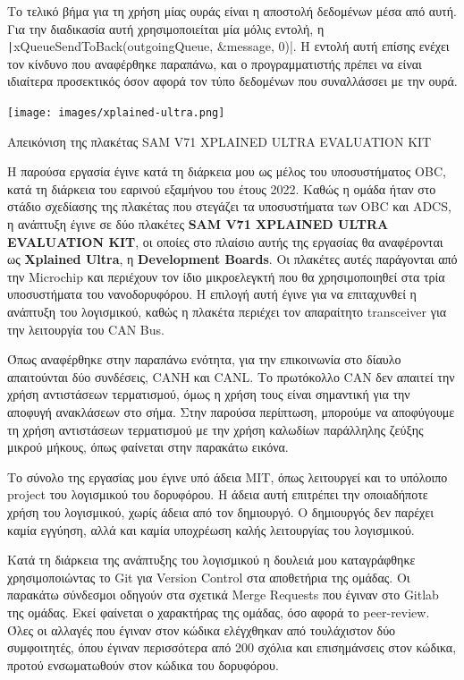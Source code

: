 \documentclass[a4paper,nobib,justified]{tufte-book}
\begin{document}
Το τελικό βήμα για τη χρήση μίας ουράς είναι η αποστολή δεδομένων μέσα από αυτή. Για την διαδικασία αυτή χρησιμοποιείται μία μόλις εντολή, η \texttt|xQueueSendToBack(outgoingQueue, &message, 0)|. Η εντολή αυτή επίσης ενέχει τον κίνδυνο που αναφέρθηκε παραπάνω, και ο προγραμματιστής πρέπει να είναι ιδιαίτερα προσεκτικός όσον αφορά τον τύπο δεδομένων που συναλλάσσει με την ουρά. 

\begin{marginfigure}
	\centering
	\texttt{[image: images/xplained-ultra.png]}
	\label{fig:xplained-ultra}
	\caption[Απεικόνιση της πλακέτας SAM V71 XPLAINED ULTRA EVALUATION KIT]{Απεικόνιση της πλακέτας SAM V71 XPLAINED ULTRA EVALUATION KIT}
\end{marginfigure}
Η παρούσα εργασία έγινε κατά τη διάρκεια μου ως μέλος του υποσυστήματος OBC, κατά τη διάρκεια του εαρινού εξαμήνου του έτους 2022. Καθώς η ομάδα ήταν στο στάδιο σχεδίασης της πλακέτας που στεγάζει τα υποσυστήματα των OBC και ADCS, η ανάπτυξη έγινε σε δύο πλακέτες \textbf{SAM V71 XPLAINED ULTRA EVALUATION KIT}, οι οποίες στο πλαίσιο αυτής της εργασίας θα αναφέρονται ως \textbf{Xplained Ultra}, η \textbf{Development Boards}. Οι πλακέτες αυτές παράγονται από την Microchip και περιέχουν τον ίδιο μικροελεγκτή που θα χρησιμοποιηθεί στα τρία υποσυστήματα του νανοδορυφόρου. Η επιλογή αυτή έγινε για να επιταχυνθεί η ανάπτυξη του λογισμικού, καθώς η πλακέτα περιέχει τον απαραίτητο transceiver για την λειτουργία του CAN Bus. 

Όπως αναφέρθηκε στην παραπάνω ενότητα, για την επικοινωνία στο δίαυλο απαιτούνται δύο συνδέσεις, CANH και CANL. Το πρωτόκολλο CAN δεν απαιτεί την χρήση αντιστάσεων τερματισμού, όμως η χρήση τους είναι σημαντική για την αποφυγή ανακλάσεων στο σήμα. Στην παρούσα περίπτωση, μπορούμε να αποφύγουμε τη χρήση αντιστάσεων τερματισμού με την χρήση καλωδίων παράλληλης ζεύξης μικρού μήκους, όπως φαίνεται στην παρακάτω εικόνα.


Το σύνολο της εργασίας μου έγινε υπό άδεια MIT, όπως λειτουργεί και το υπόλοιπο project του λογισμικού του δορυφόρου. Η άδεια αυτή επιτρέπει την οποιαδήποτε χρήση του λογισμικού, χωρίς άδεια από τον δημιουργό. Ο δημιουργός δεν παρέχει καμία εγγύηση, αλλά και καμία υποχρέωση καλής λειτουργίας του λογισμικού. 

Κατά τη διάρκεια της ανάπτυξης του λογισμικού η δουλειά μου καταγράφθηκε χρησιμοποιώντας το Git για Version Control στα αποθετήρια της ομάδας. Οι παρακάτω σύνδεσμοι οδηγούν στα σχετικά Merge Requests που έγιναν στο Gitlab της ομάδας. Εκεί φαίνεται ο χαρακτήρας της ομάδας, όσο αφορά το peer-review. Όλες οι αλλαγές που έγιναν στον κώδικα ελέγχθηκαν από τουλάχιστον δύο συμφοιτητές, όπου έγιναν περισσότερα από 200 σχόλια και επισημάνσεις στον κώδικα, προτού ενσωματωθούν στον κώδικα του δορυφόρου. 
\end{document}
